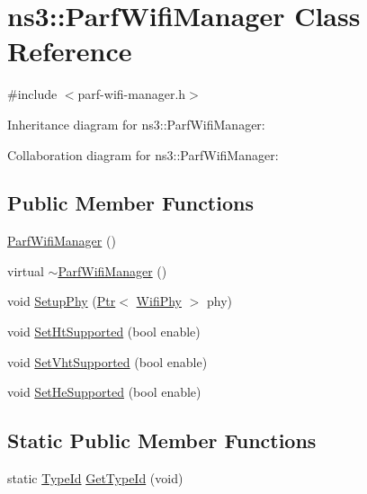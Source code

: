 \hypertarget{classns3_1_1ParfWifiManager}{}\section{ns3\+:\+:Parf\+Wifi\+Manager Class Reference}
\label{classns3_1_1ParfWifiManager}


{\ttfamily \#include $<$parf-\/wifi-\/manager.\+h$>$}



Inheritance diagram for ns3\+:\+:Parf\+Wifi\+Manager\+:


Collaboration diagram for ns3\+:\+:Parf\+Wifi\+Manager\+:
\subsection*{Public Member Functions}
\begin{DoxyCompactItemize}
\item 
\hyperlink{classns3_1_1ParfWifiManager_a1df1b5330a16cfa4a3c102e5d250e86e}{Parf\+Wifi\+Manager} ()
\item 
virtual \hyperlink{classns3_1_1ParfWifiManager_aaed63179abd0893127a81ea13650ae5a}{$\sim$\+Parf\+Wifi\+Manager} ()
\item 
void \hyperlink{classns3_1_1ParfWifiManager_a40153539bb00ae70918334cf428acde7}{Setup\+Phy} (\hyperlink{classns3_1_1Ptr}{Ptr}$<$ \hyperlink{classns3_1_1WifiPhy}{Wifi\+Phy} $>$ phy)
\item 
void \hyperlink{classns3_1_1ParfWifiManager_a7c158b58f1c3674908092feacaba7785}{Set\+Ht\+Supported} (bool enable)
\item 
void \hyperlink{classns3_1_1ParfWifiManager_a981217b076054d8624863818428a4e55}{Set\+Vht\+Supported} (bool enable)
\item 
void \hyperlink{classns3_1_1ParfWifiManager_a0522b1ea8eea0cb41df38a703835352c}{Set\+He\+Supported} (bool enable)
\end{DoxyCompactItemize}
\subsection*{Static Public Member Functions}
\begin{DoxyCompactItemize}
\item 
static \hyperlink{classns3_1_1TypeId}{Type\+Id} \hyperlink{classns3_1_1ParfWifiManager_a97357e8d12070945049cae0b20d88b64}{Get\+Type\+Id} (void)
\end{DoxyCompactItemize}
